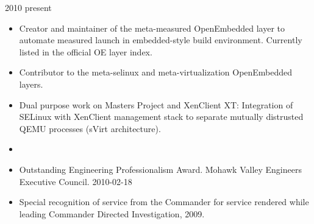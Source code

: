 \documentclass[letterpaper,11pt]{article}
\begin{document}
       {2010} {present}
      \begin {itemize}
        \setlength {\itemsep}{1pt}
        \setlength {\parskip}{0pt}
        \setlength {\parsep}{0pt}
      \item
        Creator and maintainer of the meta-measured OpenEmbedded layer to automate measured launch in embedded-style build environment.
        Currently listed in the official OE layer index.
      \item Contributor to the meta-selinux and meta-virtualization OpenEmbedded layers.
      \item
        Dual purpose work on Masters Project and XenClient XT:
        Integration of SELinux with XenClient management stack to separate mutually distrusted QEMU processes (sVirt architecture).
      \end {itemize}
      \pagebreak

    \begin{itemize}
    \item[]
    \end{itemize}

    \begin {itemize}
      \setlength {\itemsep}{1pt}
      \setlength {\parskip}{0pt}
      \setlength {\parsep}{0pt}
    \item Outstanding Engineering Professionalism Award.
      Mohawk Valley Engineers Executive Council.
      2010-02-18
    \item Special recognition of service from the Commander for service rendered while leading Commander Directed Investigation, 2009.
    \end {itemize}
\end{document}
